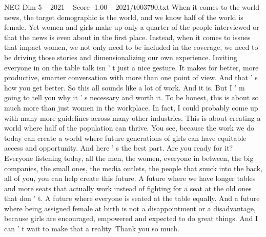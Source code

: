 \begin{textsample}{NEG Dim 5 – 2021 – Score -1.00 – 2021/t003790.txt}
When it comes to the world news, the target demographic is the world, and we know half of the world is female.
Yet women and girls make up only a quarter of the people interviewed or that the news is even about in the first place.
Instead, when it comes to issues that impact women, we not only need to be included in the coverage, we need to be driving those stories and dimensionalizing our own experience.
Inviting everyone in on the table talk isn ' t just a nice gesture.
It makes for better, more productive, smarter conversation with more than one point of view.
And that ' s how you get better.
So this all sounds like a lot of work.
And it is.
But I ' m going to tell you why it ' s necessary and worth it.
To be honest, this is about so much more than just women in the workplace.
In fact, I could probably come up with many more guidelines across many other industries.
This is about creating a world where half of the population can thrive.
You see, because the work we do today can create a world where future generations of girls can have equitable access and opportunity.
And here ' s the best part.
Are you ready for it?
Everyone listening today, all the men, the women, everyone in between, the big companies, the small ones, the media outlets, the people that snuck into the back, all of you, you can help create this future.
A future where we have longer tables and more seats that actually work instead of fighting for a seat at the old ones that don ' t.
A future where everyone is seated at the table equally.
And a future where being assigned female at birth is not a disappointment or a disadvantage, because girls are encouraged, empowered and expected to do great things.
And I can ' t wait to make that a reality.
Thank you so much.

\end{textsample}
